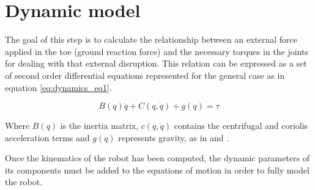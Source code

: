 \section{Dynamic model}
\label{sec_dynamic_model}
The goal of this step is to calculate the relationship between an external force applied in the toe (ground reaction force) and the necessary torques in the joints for dealing with that external disruption.
This relation can be expressed as a set of second order differential equations represented for the general case as in equation \ref{eq:dynamics_eq1}.

\begin{equation}
	\label{eq:dynamics_eq1}
	B(q)\ddot{q} + C(q,\dot{q}) + g(q) = \tau
\end{equation}

Where $B(q)$ is the inertia matrix, $c(q,\dot{q})$ contains the centrifugal and coriolis acceleration terms and $g(q)$ represents gravity, as in \cite{dynamics1} and \cite{dynamics2}.

Once the kinematics of the robot has been computed, the dynamic parameters of its components must be added to the equations of motion in order to fully model the robot.




